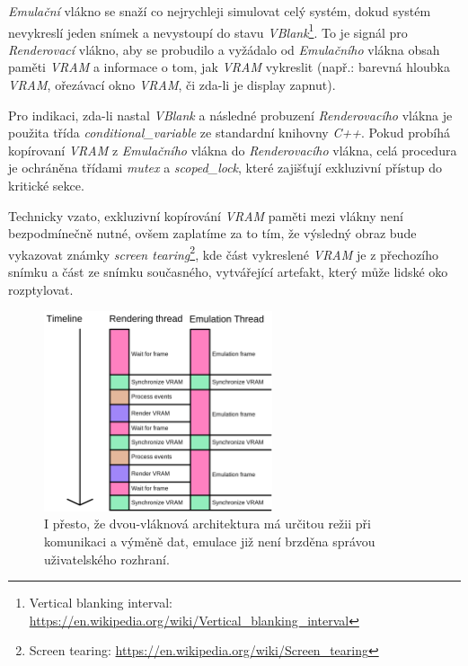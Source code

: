 \textit{Emulační} vlákno se snaží co nejrychleji simulovat celý systém, dokud systém nevykreslí jeden snímek a nevystoupí do stavu \textit{VBlank}\footnote{Vertical blanking interval: \url{https://en.wikipedia.org/wiki/Vertical_blanking_interval}}.
To je signál pro \textit{Renderovací} vlákno, aby se probudilo a vyžádalo od \textit{Emulačního} vlákna obsah paměti \textit{VRAM} a informace
o tom, jak \textit{VRAM} vykreslit (např.: barevná hloubka \textit{VRAM}, ořezávací okno \textit{VRAM}, či zda-li je display zapnut).

Pro indikaci, zda-li nastal \textit{VBlank} a následné probuzení \textit{Renderovacího} vlákna je použita třída \textit{conditional\_variable} 
ze standardní knihovny \textit{C++}. Pokud probíhá kopírovaní \textit{VRAM} z \textit{Emulačního} vlákna do \textit{Renderovacího} vlákna,
celá procedura je ochráněna třídami \textit{mutex} a \textit{scoped\_lock}, které zajišťují exkluzivní přístup do kritické sekce.

Technicky vzato, exkluzivní kopírování \textit{VRAM} paměti mezi vlákny není bezpodmínečně nutné, ovšem zaplatíme za to tím, že výsledný obraz bude
vykazovat známky \textit{screen tearing}\footnote{Screen tearing: \url{https://en.wikipedia.org/wiki/Screen_tearing}}, kde část vykreslené \textit{VRAM} je z přechozího snímku a část ze snímku současného, vytvářející
artefakt, který může lidské oko rozptylovat.

\begin{figure}[h]
	\centering
	\includegraphics[width=0.6\textwidth]{obrazky-figures/frontend-arch-doublethreaded.png}
	\caption[Dvouvláknová architektura emulátoru]{I přesto, že dvou-vláknová architektura má určitou režii při komunikaci a výměně dat,
	emulace již není brzděna správou uživatelského rozhraní.}
	\label{double-threaded-arch}
\end{figure}

